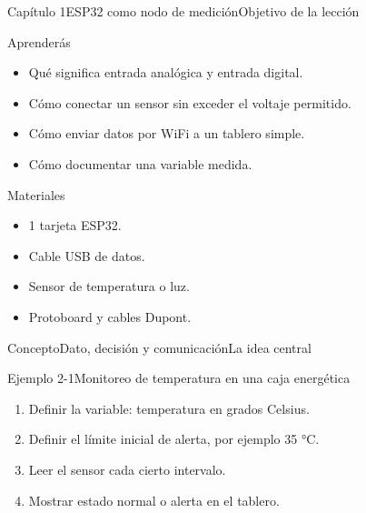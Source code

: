 \documentclass{../plantilla/hvtbook}
\begin{document}
\HVTMakeTitle
\begin{HVTPage}{Capítulo 1}{ESP32 como nodo de medición}{Objetivo de la lección}
\begin{HVTGrid}
\begin{HVTColumn}{Aprenderás}\begin{itemize}\item Qué significa entrada analógica y entrada digital. \item Cómo conectar un sensor sin exceder el voltaje permitido. \item Cómo enviar datos por WiFi a un tablero simple. \item Cómo documentar una variable medida.\end{itemize}\end{HVTColumn}
\begin{HVTColumn}{Materiales}\begin{itemize}\item 1 tarjeta ESP32. \item Cable USB de datos. \item Sensor de temperatura o luz. \item Protoboard y cables Dupont.\end{itemize}\end{HVTColumn}
\end{HVTGrid}
\end{HVTPage}
\begin{HVTPage}{Concepto}{Dato, decisión y comunicación}{La idea central}
\begin{HVTFlow}\end{HVTFlow}
\begin{HVTExample}{Ejemplo 2-1}{Monitoreo de temperatura en una caja energética}\begin{enumerate}\item Definir la variable: temperatura en grados Celsius. \item Definir el límite inicial de alerta, por ejemplo 35 °C. \item Leer el sensor cada cierto intervalo. \item Mostrar estado normal o alerta en el tablero.\end{enumerate}\end{HVTExample}
\end{HVTPage}
\end{document}
